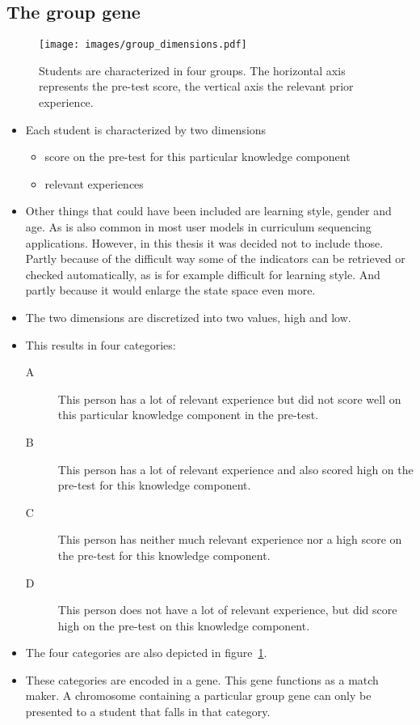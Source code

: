 \subsection{The group gene}
\begin{figure}[ht!]
	\centering
	\texttt{[image: images/group\_dimensions.pdf]}
	\caption[Group characterization]{Students are characterized in four groups.
		The horizontal axis represents the pre-test score, the vertical axis
		the relevant prior experience.}
	\label{fig:group_dimensions}
\end{figure}
\begin{itemize}
	\item Each student is characterized by two dimensions
		\begin{itemize}
			\item score on the pre-test for this particular knowledge component
			\item relevant experiences
		\end{itemize}
	\item Other things that could have been included are learning
		style, gender and age. As is also common in most user models in
		curriculum sequencing applications. However, in this thesis it
		was decided not to include those. Partly because of the
		difficult way some of the indicators can be retrieved or
		checked automatically, as is for example difficult for learning
		style. And partly because it would enlarge the state space even
		more.
	\item The two dimensions are discretized into two values, high and low.
	\item This results in four categories:
		\begin{description}
			\item[A] This person has a lot of relevant experience but did not
				score well on this particular knowledge component in the
				pre-test.
			\item[B] This person has a lot of relevant experience and also
				scored high on the pre-test for this knowledge component.
			\item[C] This person has neither much relevant experience nor
				a high score on the pre-test for this knowledge component.
			\item[D] This person does not have a lot of relevant experience,
				but did score high on the pre-test on this knowledge component.
		\end{description}
	\item The four categories are also depicted in figure~\ref{fig:group_dimensions}.
	\item These categories are encoded in a gene. This gene functions as a
		match maker. A chromosome containing a particular group gene can only
		be presented to a student that falls in that category.
\end{itemize}
